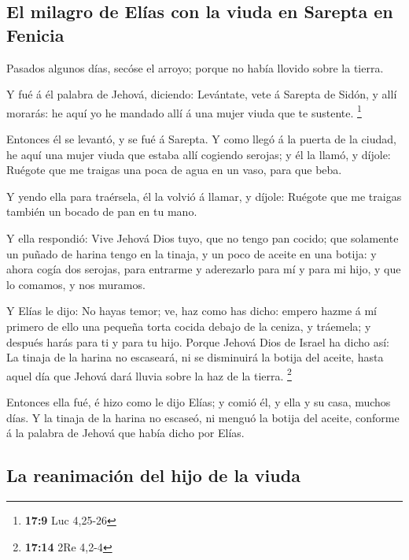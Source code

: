 \hypertarget{el-milagro-de-eluxedas-con-la-viuda-en-sarepta-en-fenicia}{%
\subsection{El milagro de Elías con la viuda en Sarepta en
Fenicia}\label{el-milagro-de-eluxedas-con-la-viuda-en-sarepta-en-fenicia}}

 Pasados algunos días, secóse el arroyo; porque no había
llovido sobre la tierra.

 Y fué á él palabra de Jehová, diciendo: 
Levántate, vete á Sarepta de Sidón, y allí morarás: he aquí yo he
mandado allí á una mujer viuda que te sustente. \footnote{\textbf{17:9}
  Luc 4,25-26}

 Entonces él se levantó, y se fué á Sarepta. Y como llegó á
la puerta de la ciudad, he aquí una mujer viuda que estaba allí cogiendo
serojas; y él la llamó, y díjole: Ruégote que me traigas una poca de
agua en un vaso, para que beba.

 Y yendo ella para traérsela, él la volvió á llamar, y
díjole: Ruégote que me traigas también un bocado de pan en tu mano.

 Y ella respondió: Vive Jehová Dios tuyo, que no tengo pan
cocido; que solamente un puñado de harina tengo en la tinaja, y un poco
de aceite en una botija: y ahora cogía dos serojas, para entrarme y
aderezarlo para mí y para mi hijo, y que lo comamos, y nos muramos.

 Y Elías le dijo: No hayas temor; ve, haz como has dicho:
empero hazme á mí primero de ello una pequeña torta cocida debajo de la
ceniza, y tráemela; y después harás para ti y para tu hijo.
 Porque Jehová Dios de Israel ha dicho así: La tinaja de la
harina no escaseará, ni se disminuirá la botija del aceite, hasta aquel
día que Jehová dará lluvia sobre la haz de la tierra. \footnote{\textbf{17:14}
  2Re 4,2-4}

 Entonces ella fué, é hizo como le dijo Elías; y comió él,
y ella y su casa, muchos días.  Y la tinaja de la harina no
escaseó, ni menguó la botija del aceite, conforme á la palabra de Jehová
que había dicho por Elías.

\hypertarget{la-reanimaciuxf3n-del-hijo-de-la-viuda}{%
\subsection{La reanimación del hijo de la
viuda}\label{la-reanimaciuxf3n-del-hijo-de-la-viuda}}


